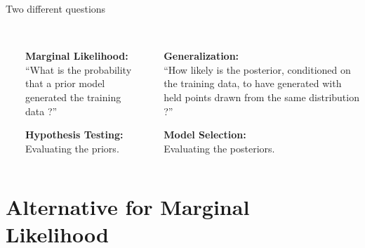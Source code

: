 \documentclass[t, aspectratio=169]{beamer}
\begin{document}
\begin{frame}{Two different questions}
 \begin{columns}[onlytextwidth]\

\begin{column}{0.45\textwidth}\\
\vspace{0.8cm}
\textbf{Marginal Likelihood:}\\
\vspace{0.6cm}
“What is the probability that a prior model generated the training data ?”

\vspace{1.2cm}
\textbf{Hypothesis Testing:}\\
\vspace{0.6cm}
Evaluating the priors.



\end{column}

\begin{column}{0.05\textwidth}\\
\Large{}
    \rule[-100pt]{2pt}{300pt}
\end{column}




  \begin{column}{0.5\textwidth}\\
\vspace{0.8cm}
\textbf{Generalization:}\\
\vspace{0.6cm}
“How likely is the posterior, conditioned on the training data, to have generated with held points drawn from the same distribution ?”


\vspace{1.2cm}
\textbf{Model Selection:}\\
\vspace{0.6cm}
Evaluating the posteriors.



\end{column}
   
 \end{columns}
 \end{frame}  
 

\section{Alternative for Marginal Likelihood}

\end{document}
